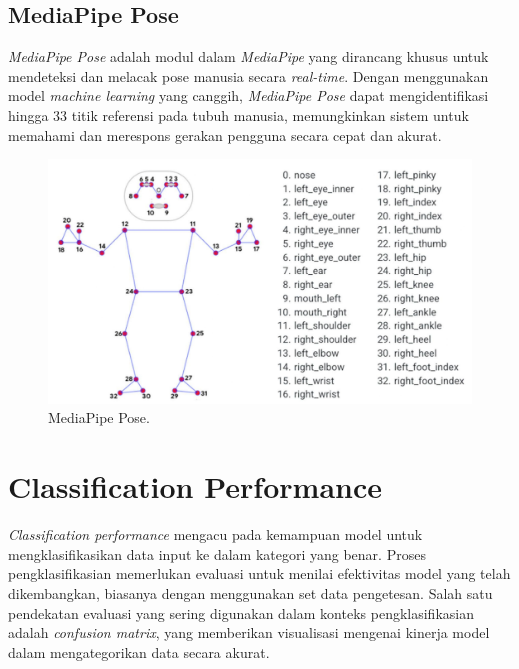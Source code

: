 \subsection{MediaPipe Pose}
\label{subsec:MediaPipe Pose}

\emph{MediaPipe Pose} adalah modul dalam \emph{MediaPipe} yang dirancang khusus untuk mendeteksi dan melacak pose manusia secara \emph{real-time}. Dengan menggunakan model \emph{machine learning} yang canggih, \emph{MediaPipe Pose} dapat mengidentifikasi hingga 33 titik referensi pada tubuh manusia, memungkinkan sistem untuk memahami dan merespons gerakan pengguna secara cepat dan akurat.

\begin{figure}[H]
  \centering
  \includegraphics[scale=0.5]{gambar/mp_pose.jpg}
  \caption{MediaPipe Pose.}
  \label{fig:mp_pose}
\end{figure}

\section{Classification Performance}
\label{sec:Classification Performance}

\emph{Classification performance} mengacu pada kemampuan model untuk mengklasifikasikan data input ke dalam kategori yang benar. Proses pengklasifikasian memerlukan evaluasi untuk menilai efektivitas model yang telah dikembangkan, biasanya dengan menggunakan set data pengetesan. Salah satu pendekatan evaluasi yang sering digunakan dalam konteks pengklasifikasian adalah \emph{confusion matrix}, yang memberikan visualisasi mengenai kinerja model dalam mengategorikan data secara akurat.

